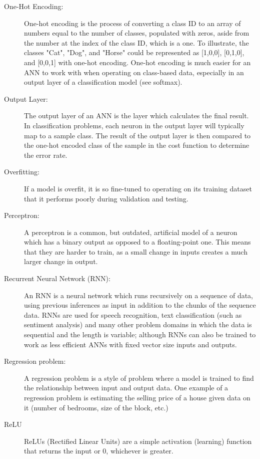\documentclass[]{report}
\begin{document}
\begin{description}
\item[One-Hot Encoding:] One-hot encoding is the process of converting a class ID to an array of numbers equal to the number of classes, populated with zeros, aside from the number at the index of the class ID, which is a one. To illustrate, the classes "Cat", "Dog", and "Horse" could be represented as [1,0,0], [0,1,0], and [0,0,1] with one-hot encoding. One-hot encoding is much easier for an ANN to work with when operating on class-based data, especially in an output layer of a classification model (see softmax).

\item[Output Layer:] The output layer of an ANN is the layer which calculates the final result. In classification problems, each neuron in the output layer will typically map to a sample class. The result of the output layer is then compared to the one-hot encoded class of the sample in the cost function to determine the error rate.

\item[Overfitting:] If a model is overfit, it is so fine-tuned to operating on its training dataset that it performs poorly during validation and testing.

\item[Perceptron:] A perceptron is a common, but outdated, artificial model of a neuron which has a binary output as opposed to a floating-point one. This means that they are harder to train, as a small change in inputs creates a much larger change in output.

\item[Recurrent Neural Network (RNN):] An RNN is a neural network which runs recursively on a sequence of data, using previous inferences as input in addition to the chunks of the sequence data. RNNs are used for speech recognition, text classification (such as sentiment analysis) and many other problem domains in which the data is sequential and the length is variable; although RNNs can also be trained to work as less efficient ANNs with fixed vector size inputs and outputs.

\item[Regression problem:] A regression problem is a style of problem where a model is trained to find the relationship between input and output data. One example of a regression problem is estimating the selling price of a house given data on it (number of bedrooms, size of the block, etc.)	

\item[ReLU] ReLUs (Rectified Linear Units) are a simple activation (learning) function that returns the input or 0, whichever is greater.


\end{description}
\end{document}
